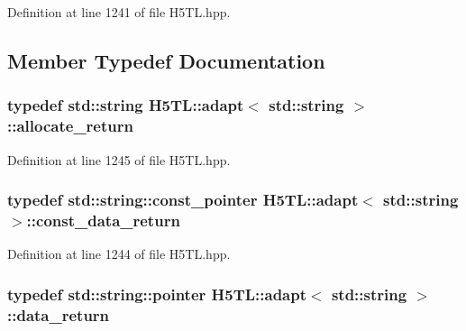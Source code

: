 Definition at line 1241 of file H5\-T\-L.\-hpp.



\subsection{Member Typedef Documentation}
\hypertarget{struct_h5_t_l_1_1adapt_3_01std_1_1string_01_4_ad34f256350ab9c209202b0cc0e84a8fd}{
\subsubsection[{allocate\-\_\-return}]{\setlength{\rightskip}{0pt plus 5cm}typedef std\-::string {\bf H5\-T\-L\-::adapt}$<$ std\-::string $>$\-::{\bf allocate\-\_\-return}}}\label{struct_h5_t_l_1_1adapt_3_01std_1_1string_01_4_ad34f256350ab9c209202b0cc0e84a8fd}


Definition at line 1245 of file H5\-T\-L.\-hpp.

\hypertarget{struct_h5_t_l_1_1adapt_3_01std_1_1string_01_4_a20cf03cb4783ce83295d1038409c6cee}{
\subsubsection[{const\-\_\-data\-\_\-return}]{\setlength{\rightskip}{0pt plus 5cm}typedef std\-::string\-::const\-\_\-pointer {\bf H5\-T\-L\-::adapt}$<$ std\-::string $>$\-::{\bf const\-\_\-data\-\_\-return}}}\label{struct_h5_t_l_1_1adapt_3_01std_1_1string_01_4_a20cf03cb4783ce83295d1038409c6cee}


Definition at line 1244 of file H5\-T\-L.\-hpp.

\hypertarget{struct_h5_t_l_1_1adapt_3_01std_1_1string_01_4_ae65d6d1845858272965eb9df9e1391f7}{
\subsubsection[{data\-\_\-return}]{\setlength{\rightskip}{0pt plus 5cm}typedef std\-::string\-::pointer {\bf H5\-T\-L\-::adapt}$<$ std\-::string $>$\-::{\bf data\-\_\-return}}}\label{struct_h5_t_l_1_1adapt_3_01std_1_1string_01_4_ae65d6d1845858272965eb9df9e1391f7}


